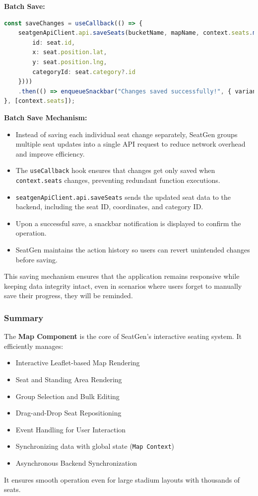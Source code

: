 \textbf{Batch Save:}
\begin{lstlisting}[language=TypeScript, caption=Batch Save Mechanism, label=lst:batch-save-seats]
const saveChanges = useCallback(() => {
    seatgenApiClient.api.saveSeats(bucketName, mapName, context.seats.map(seat => ({
        id: seat.id,
        x: seat.position.lat,
        y: seat.position.lng,
        categoryId: seat.category?.id
    })))
    .then(() => enqueueSnackbar("Changes saved successfully!", { variant: "success" }));
}, [context.seats]);
\end{lstlisting}

\textbf{Batch Save Mechanism:}
\begin{itemize}
    \item Instead of saving each individual seat change separately, SeatGen groups multiple seat updates into a single API request to reduce network overhead and improve efficiency.
    \item The \texttt{useCallback} hook ensures that changes get only saved when \texttt{context.seats} changes, preventing redundant function executions.
    \item \texttt{seatgenApiClient.api.saveSeats} sends the updated seat data to the backend, including the seat ID, coordinates, and category ID.
    \item Upon a successful save, a snackbar notification is displayed to confirm the operation.
    \item SeatGen maintains the action history so users can revert unintended changes before saving.
\end{itemize}

This saving mechanism ensures that the application remains responsive while keeping data integrity intact, even in scenarios where users forget to manually save their progress, they will be reminded.

\subsubsection{Summary}
The \textbf{Map Component} is the core of SeatGen’s interactive seating system. It efficiently manages:
\begin{itemize}
    \item Interactive Leaflet-based Map Rendering
    \item Seat and Standing Area Rendering
    \item Group Selection and Bulk Editing
    \item Drag-and-Drop Seat Repositioning
    \item Event Handling for User Interaction
    \item Synchronizing data with global state (\texttt{Map Context})
    \item Asynchronous Backend Synchronization
\end{itemize}

It ensures smooth operation even for large stadium layouts with thousands of seats.


